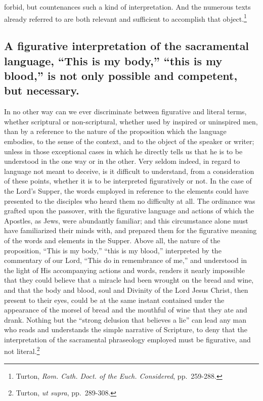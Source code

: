 \documentclass[english,]{book}
\begin{document}
forbid, but countenances such a kind of interpretation. And the numerous texts already referred to are both relevant and sufficient to accomplish that object.\footnote{Turton, \emph{Rom. Cath. Doct. of the Euch. Considered}, pp.~259-288.}

\hypertarget{a-figurative-interpretation-of-the-sacramental-language-this-is-my-body-this-is-my-blood-is-not-only-possible-and-competent-but-necessary.}{%
\subsection{A figurative interpretation of the sacramental language, ``This is my body,'' ``this is my blood,'' is not only possible and competent, but necessary.}\label{a-figurative-interpretation-of-the-sacramental-language-this-is-my-body-this-is-my-blood-is-not-only-possible-and-competent-but-necessary.}}

In no other way can we ever discriminate between figurative and literal terms, whether scriptural or non-scriptural, whether used by inspired or uninspired men, than by a reference to the nature of the proposition which the language embodies, to the sense of the context, and to the object of the speaker or writer; unless in those exceptional cases in which he directly tells us that he is to be understood in the one way or in the other. Very seldom indeed, in regard to language not meant to deceive, is it difficult to understand, from a consideration of these points, whether it is to be interpreted figuratively or not. In the case of the Lord's Supper, the words employed in reference to the elements could have presented to the disciples who heard them no difficulty at all. The ordinance was grafted upon the passover, with the figurative language and actions of which the Apostles, as Jews, were abundantly familiar; and this circumstance alone must have familiarized their minds with, and prepared them for the figurative meaning of the words and elements in the Supper. Above all, the nature of the proposition, ``This is my body,'' ``this is my blood,'' interpreted by the commentary of our Lord, ``This do in remembrance of me,'' and understood in the light of His accompanying actions and words, renders it nearly impossible that they could believe that a miracle had been wrought on the bread and wine, and that the body and blood, soul and Divinity of the Lord Jesus Christ, then present to their eyes, could be at the same instant contained under the appearance of the morsel of bread and the mouthful of wine that they ate and drank. Nothing but the ``strong delusion that believes a lie'' can lead any man who reads and understands the simple narrative of Scripture, to deny that the interpretation of the sacramental phraseology employed must be figurative, and not literal.\footnote{Turton, \emph{ut supra}, pp.~289-308.}
\end{document}
